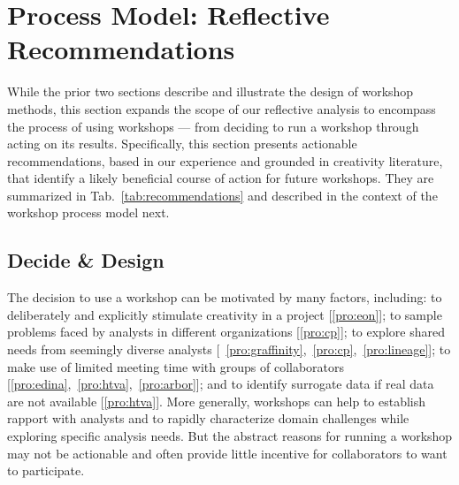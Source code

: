 \section{Process Model: Reflective Recommendations}
\label{sec:process}

While the prior two sections describe and illustrate the design of workshop methods, this section expands the scope of our reflective analysis to encompass the process of using workshops --- from deciding to run a workshop through acting on its results. Specifically, this section presents  actionable recommendations, based in our experience and grounded in creativity literature, that identify a likely beneficial course of action for future workshops. They are summarized in Tab.~\ref{tab:recommendations} and described in the context of the workshop process model next.



\subsection{Decide \& Design}

The decision to use a workshop can be motivated by many factors, including: to deliberately and explicitly stimulate creativity in a project [\ref{pro:eon}]; to sample problems faced by analysts in different organizations [\ref{pro:cp}]; to explore shared needs from seemingly diverse analysts [~\ref{pro:graffinity},~\ref{pro:cp},~\ref{pro:lineage}]; to make use of limited meeting time with groups of collaborators [\ref{pro:edina},~\ref{pro:htva},~\ref{pro:arbor}]; and to identify surrogate data if real data are not available [\ref{pro:htva}]. More generally, workshops can help to establish rapport with analysts and to rapidly characterize domain challenges while exploring specific analysis needs. But the abstract reasons for running a workshop may not be actionable and often provide little incentive for collaborators to want to participate. 

